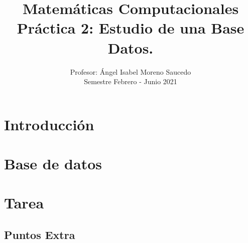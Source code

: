 
\graphicspath{{../../../matematicascomputacionales/Practica_02/}}

\title{Matemáticas Computacionales \\ Práctica 2: Estudio de una Base Datos.}
\author{Profesor: Ángel Isabel Moreno Saucedo \\ Semestre Febrero - Junio 2021}
\date{}



\maketitle

\section{Introducci\'{o}n} \label{sec:intro}



\section{Base de datos} \label{sec:montecarlo}

\section{Tarea} \label{sec:tarea}

\subsection{Puntos Extra}





